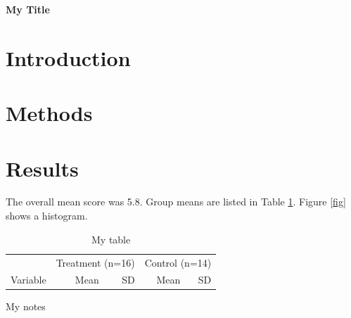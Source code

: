 \documentclass{article}\usepackage{knitr}
\date{}
\begin{document}
\begin{flushleft}
{\Large
\textbf{My Title}
}
\end{flushleft}




\section{Introduction}






\section{Methods}





\section{Results}









The overall mean score was 5.8. Group means are listed in Table \ref{tbl}. Figure \ref{fig} shows a histogram.

\begin{table}[H]
\centering
  \begin{threeparttable}
  \caption{My table}
  \label{tbl}
  \begin{tabular}{lrrrr}
  \toprule
   & \multicolumn{2}{c}{Treatment (n=16)} & \multicolumn{2}{c}{Control (n=14)} \\
  \cmidrule(lr){2-3} \cmidrule(lr){4-5}
  Variable & Mean & SD & Mean & SD \\
  \midrule
  
  \bottomrule
  \end{tabular}
  \begin{tablenotes}
  \small
  \item My notes
  \end{tablenotes}
  \end{threeparttable}
\end{table}
\end{document}
